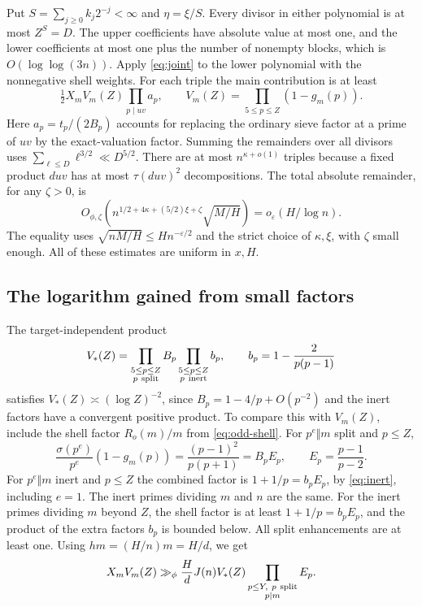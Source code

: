 Put \(S=\sum_{j\ge0}k_j2^{-j}<\infty\) and \(\eta=\xi/S\).
Every divisor in either polynomial is at most \(Z^S=D\).
The upper coefficients have absolute value at most one, and
the lower coefficients at most one plus the number of nonempty
blocks, which is \(O(\log\log(3n))\). Apply \eqref{eq:joint}
to the lower polynomial with the nonnegative shell weights.
For each triple the main contribution is at least
\begin{equation}\label{eq:lower-main}
 \tfrac12 X_m V_m(Z)\prod_{p\mid uv}a_p,\qquad
 V_m(Z)=\prod_{5\le p\le Z}(1-g_m(p)).
\end{equation}
Here \(a_p=t_p/(2B_p)\) accounts for replacing the ordinary
sieve factor at a prime of \(uv\) by the exact-valuation factor.
Summing the remainders over all divisors uses
\(\sum_{\ell\le D}\ell^{3/2}\ll D^{5/2}\). There are at most
\(n^{\kappa+o(1)}\) triples because a fixed product \(duv\)
has at most \(\tau(duv)^2\) decompositions. The total absolute
remainder, for any \(\zeta>0\), is
\[
 O_{\phi,\zeta}\!\left(
       n^{1/2+4\kappa+(5/2)\xi+\zeta}\sqrt{M/H}\right)
   =o_\varepsilon(H/\log n).
\]
The equality uses
\(\sqrt{nM/H}\le Hn^{-\varepsilon/2}\)
and the strict choice of \(\kappa,\xi\), with \(\zeta\) small
enough. All of these estimates are uniform in \(x,H\).

\subsection{The logarithm gained from small factors}\label{sec:cofactor-log}
The target-independent product
\[
 V_*(Z)=
 \prod_{\substack{5\le p\le Z\\ p\ {\rm split}}}B_p
 \prod_{\substack{5\le p\le Z\\ p\ {\rm inert}}}b_p,
 \qquad b_p=1-\frac2{p(p-1)}
\]
satisfies \(V_*(Z)\asymp(\log Z)^{-2}\), since
\(B_p=1-4/p+O(p^{-2})\) and the inert factors have a convergent
positive product. To compare this with \(V_m(Z)\), include the
shell factor \(R_o(m)/m\) from \eqref{eq:odd-shell}.
For \(p^e\Vert m\) split and \(p\le Z\),
\[
 \frac{\sigma(p^e)}{p^e}(1-g_m(p))
       =\frac{(p-1)^2}{p(p+1)}=B_p E_p,\qquad
 E_p=\frac{p-1}{p-2}.
\]
For \(p^e\Vert m\) inert and \(p\le Z\) the combined factor
is \(1+1/p=b_p E_p\), by \eqref{eq:inert}, including \(e=1\).
The inert primes dividing \(m\) and \(n\) are the same.
For the inert primes dividing \(m\) beyond \(Z\), the shell
factor is at least \(1+1/p=b_pE_p\), and the product of the
extra factors \(b_p\) is bounded below. All split enhancements
are at least one. Using \(h m=(H/n)m=H/d\), we get
\begin{equation}\label{eq:target-gain}
 X_m V_m(Z)\gg_\phi
     \frac H d J(n)V_*(Z)
     \prod_{\substack{p\le Y,\ p\ {\rm split}\\ p\mid m}}E_p .
\end{equation}

